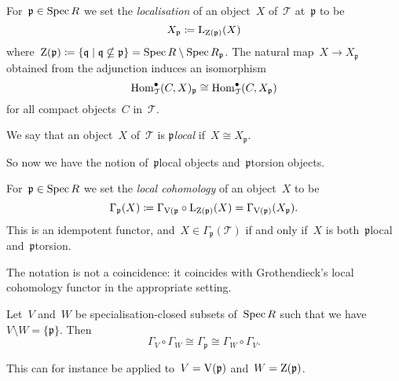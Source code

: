 \documentclass[10pt,a4paper]{article}
\begin{document}
For~$\mathfrak{p}\in\operatorname{Spec} R$ we set the \emph{localisation} of an object~$X$ of~$\mathcal{T}$ at~$\mathfrak{p}$ to be
\begin{equation}
  X_{\mathfrak{p}}\coloneqq\operatorname{L}_{\operatorname{Z}(\mathfrak{p})}(X)
\end{equation}
where~$\operatorname{Z}(\mathfrak{p})\coloneqq\{\mathfrak{q}\mid\mathfrak{q}\nsubseteq\mathfrak{p}\}=\operatorname{Spec} R\setminus\operatorname{Spec} R_{\mathfrak{p}}$. The natural map~$X\to X_{\mathfrak{p}}$ obtained from the adjunction induces an isomorphism
\begin{equation}
  \operatorname{Hom}_{\mathcal{T}}^\bullet(C,X)_{\mathfrak{p}}\cong\operatorname{Hom}_{\mathcal{T}}^\bullet(C,X_{\mathfrak{p}})
\end{equation}
for all compact objects~$C$ in~$\mathcal{T}$.

\begin{definition}
  We say that an object~$X$ of~$\mathcal{T}$ is \emph{$\mathfrak{p}$\dash local} if~$X\cong X_{\mathfrak{p}}$.
\end{definition}

So now we have the notion of~$\mathfrak{p}$\dash local objects and~$\mathfrak{p}$\dash torsion objects.

\begin{definition}
  For~$\mathfrak{p}\in\operatorname{Spec} R$ we set the \emph{local cohomology} of an object~$X$ to be
  \begin{equation}
    \Gamma_{\mathfrak{p}}(X)\coloneqq\Gamma_{\operatorname{V}(\mathfrak{p}}\circ\operatorname{L}_{\operatorname{Z}(\mathfrak{p})}(X)=\Gamma_{\operatorname{V}(\mathfrak{p})}(X_{\mathfrak{p}}).
  \end{equation}
  This is an idempotent functor, and~$X\in\Gamma_{\mathfrak{p}}(\mathcal{T})$ if and only if~$X$ is both~$\mathfrak{p}$\dash local and~$\mathfrak{p}$\dash torsion.
\end{definition}

\begin{remark}
  The notation is not a coincidence: it coincides with Grothendieck's local cohomology functor in the appropriate setting.
\end{remark}

\begin{lemma}
  Let~$V$ and~$W$ be specialisation-closed subsets of~$\operatorname{Spec} R$ such that we have~$V\setminus W=\{\mathfrak{p}\}$. Then
  \begin{equation}
    \Gamma_V\circ\Gamma_W\cong\Gamma_{\mathfrak{p}}\cong\Gamma_W\circ\Gamma_V.
  \end{equation}
\end{lemma}
This can for instance be applied to~$V=\operatorname{V}(\mathfrak{p})$ and~$W=\operatorname{Z}(\mathfrak{p})$.
\end{document}
